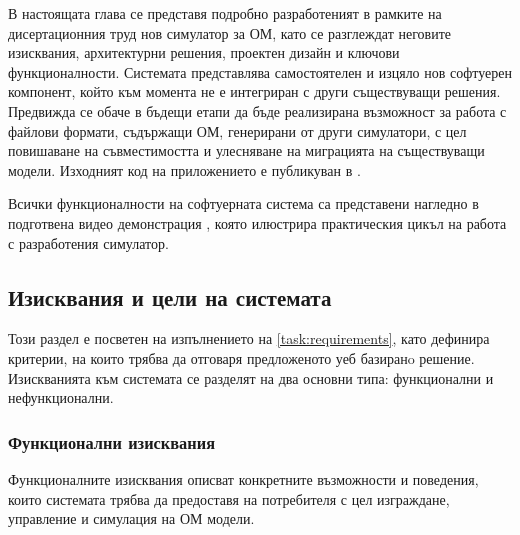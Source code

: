 
\hspace*{2.5em}В настоящата глава се представя подробно разработеният в рамките на дисертационния труд нов симулатор за ОМ, като се разглеждат неговите изисквания, архитектурни решения, проектен дизайн и ключови функционалности. Системата представлява самостоятелен и изцяло нов софтуерен компонент, който към момента не е интегриран с други съществуващи решения. Предвижда се обаче в бъдещи етапи да бъде реализирана възможност за работа с файлови формати, съдържащи ОМ, генерирани от други симулатори, с цел повишаване на съвместимостта и улесняване на миграцията на съществуващи модели. Изходният код на приложението е публикуван в \cite{phdThesisOnlineGNRepo}.

Всички функционалности на софтуерната система са представени нагледно в подготвена видео демонстрация \cite{OnlineGN-video}, която илюстрира практическия цикъл на работа с разработения симулатор.

\subsection{Изисквания и цели на системата}

\hspace*{2.5em}Този раздел е посветен на изпълнението на \ref{task:requirements}, като дефинира критерии, на които трябва да отговаря предложеното уеб базиранo решение. Изискванията към системата се разделят на два основни типа: функционални и нефункционални.

\subsubsection{Функционални изисквания}
\hspace*{2.5em}Функционалните изисквания описват конкретните възможности и поведения, които системата трябва да предоставя на потребителя с цел изграждане, управление и симулация на ОМ модели.

